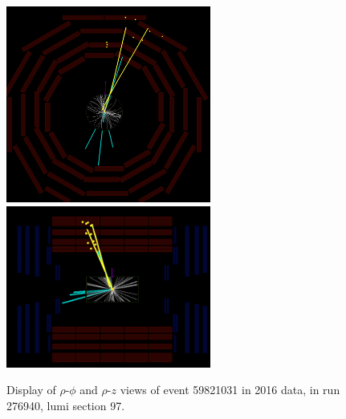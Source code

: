 \begin{figure}[htpb]
  \centering
  \includegraphics[width=0.6\textwidth]{figures/displaced/event-276940_59821031_97_RhoPhi.png}
  \includegraphics[width=0.6\textwidth]{figures/displaced/event-276940_59821031_97_RhoZ.png}
  \caption{Display of $\rho$-$\phi$ and $\rho$-$z$ views of event 59821031 in 2016 data, in run 276940, lumi section 97.}
  \label{fig:dd:event-97}
\end{figure}

